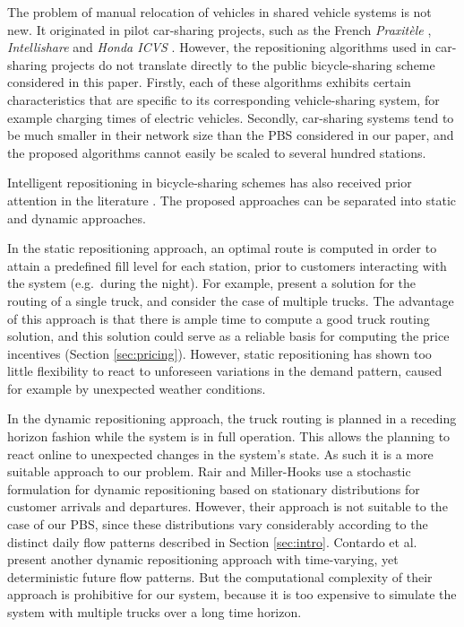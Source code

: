 \documentclass{article}
\begin{document}
The problem of manual relocation of vehicles in shared vehicle systems is not
new. It originated in pilot car-sharing projects, such as the French
\emph{Praxitèle} \cite{dror_redistribution_1998,duron_analysis_2000},
\emph{Intellishare} \cite{barth2004} and \emph{Honda ICVS}
\cite{kek_decision_2009}. However, the repositioning algorithms used in
car-sharing projects do not translate directly to the public bicycle-sharing
scheme considered in this paper. Firstly, each of these algorithms exhibits
certain characteristics that are specific to its corresponding vehicle-sharing
system, for example charging times of electric vehicles. Secondly, car-sharing systems
tend to be much smaller in their network size than the PBS considered in our
paper, and the proposed algorithms cannot easily be scaled to several hundred stations.

Intelligent repositioning in bicycle-sharing schemes has also received prior
attention in the literature \cite{shaheen_bikesharing_2010}. The proposed
approaches can be separated into static and dynamic approaches.

In the static repositioning approach, an optimal route is computed in order to
attain a predefined fill level for each station, prior to customers interacting
with the system (e.g.\ during the night). For example,
\cite{benchimol_balancing_2011} present a solution for the routing of a single
truck, and \cite{raviv_static_2012} consider the case of multiple trucks. The
advantage of this approach is that there is ample time to compute a good truck
routing solution, and this solution could serve as a reliable basis for
computing the price incentives (Section \ref{sec:pricing}). However, static
repositioning has shown too little flexibility to react to unforeseen variations
in the demand pattern, caused for example by unexpected weather conditions.

In the dynamic repositioning approach, the truck routing is planned in a
receding horizon fashion while the system is in full operation. This allows the
planning to react online to unexpected changes in the system's state. As such it
is a more suitable approach to our problem. Rair and Miller-Hooks
\cite{nair_fleet_2011} use a stochastic formulation for dynamic repositioning
based on stationary distributions for customer arrivals and departures. However,
their approach is not suitable to the case of our PBS, since these distributions
vary considerably according to the distinct daily flow patterns described in
Section \ref{sec:intro}. Contardo et al. \cite{contardo_balancing_2012} present
another dynamic repositioning approach with time-varying, yet deterministic
future flow patterns. But the computational complexity of their approach is
prohibitive for our system, because it is too expensive to simulate the system
with multiple trucks over a long time horizon.
\end{document}
